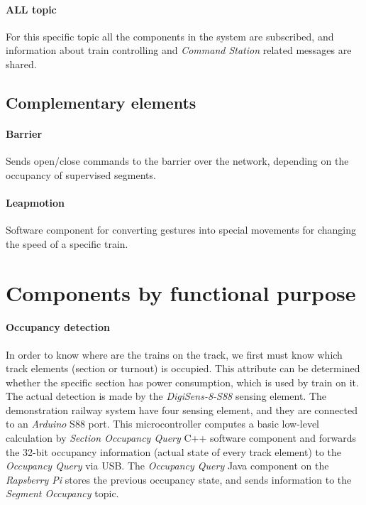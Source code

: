 \paragraph{ALL topic}
For this specific topic all the components in the system are subscribed, and information about train controlling and \textit{Command Station} related messages are shared.

\subsection{Complementary elements}
\paragraph{Barrier} 
Sends open/close commands to the barrier over the network, depending on the occupancy of supervised segments.
\paragraph{Leapmotion}
Software component for converting gestures into special movements for changing the speed of a specific train.

\section{Components by functional purpose}
\paragraph{Occupancy detection}\label{par:FunctionOccupancyDetection}
In order to know where are the trains on the track, we first must know which track elements (section or turnout) is occupied. This attribute can be determined whether the specific section has power consumption, which is used by train on it. The actual detection is made by the\textit{ DigiSens-8-S88} sensing element. The demonstration railway system have four sensing element, and they are connected to an\textit{ Arduino} S88 port. This microcontroller computes a basic low-level calculation by \textit{Section Occupancy Query} C++ software component and forwards the 32-bit occupancy information (actual state of every track element) to the \textit{Occupancy Query} via USB. The\textit{ Occupancy Query} Java component on the \textit{Rapsberry Pi} stores the previous occupancy state, and sends information to the \textit{Segment Occupancy} topic.

